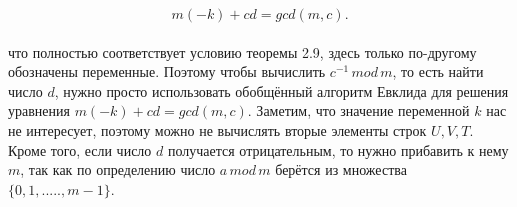 \documentclass{article}
\begin{document}
\begin{equation}
m(-k) + cd = gcd(m, c). 
 \end{equation}
\\
что полностью соответствует условию теоремы 2.9, здесь только по-другому обозначены переменные. Поэтому чтобы вычислить $c^{-1}\,mod\,m$, то есть найти число $d$, нужно просто использовать обобщённый алгоритм Евклида для решения  уравнения $m(-k) + cd = gcd(m, c)$. Заметим, что значение переменной $k$ нас не интересует, поэтому можно не вычислять вторые элементы строк $U, V, T$. Кроме того, если число $d$ получается отрицательным, то нужно прибавить к нему $m$, так как по определению число  $a\,mod\,m$ берётся из множества $\{0,1,.....,m -1\}$.
 
  
\end{document}
